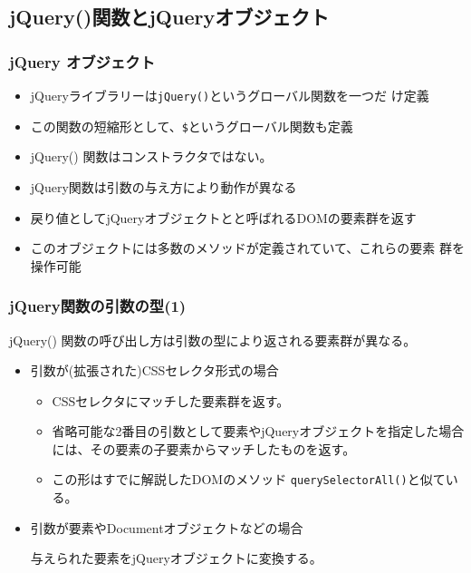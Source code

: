 \subsection{jQuery()関数とjQueryオブジェクト}
\begin{frame}[containsverbatim]
\frametitle{jQuery オブジェクト}
\begin{itemize}
 \item jQueryライブラリーは\texttt{jQuery()}というグローバル関数を一つだ
       け定義
 \item この関数の短縮形として、\texttt{\$}というグローバル関数も定義
 \item jQuery() 関数はコンストラクタではない。
 \item jQuery関数は引数の与え方により動作が異なる
 \item 戻り値としてjQueryオブジェクトとと呼ばれるDOMの要素群を返す
 \item このオブジェクトには多数のメソッドが定義されていて、これらの要素
       群を操作可能
\end{itemize}
\end{frame}
\begin{frame}[containsverbatim]
\frametitle{jQuery関数の引数の型(1)}
jQuery() 関数の呼び出し方は引数の型により返される要素群が異なる。
\begin{itemize}
 \item 引数が(拡張された)CSSセレクタ形式の場合

\begin{itemize}
 \item CSSセレクタにマッチした要素群を返す。
 \item 省略可能な2番目の引数として要素やjQueryオブジェクトを指定した場合
       には、その要素の子要素からマッチしたものを返す。
 \item この形はすでに解説したDOMのメソッド
       \texttt{querySelectorAll()}と似ている。
\end{itemize}  
 \item 引数が要素やDocumentオブジェクトなどの場合

       与えられた要素をjQueryオブジェクトに変換する。
\end{itemize}
\end{frame}

